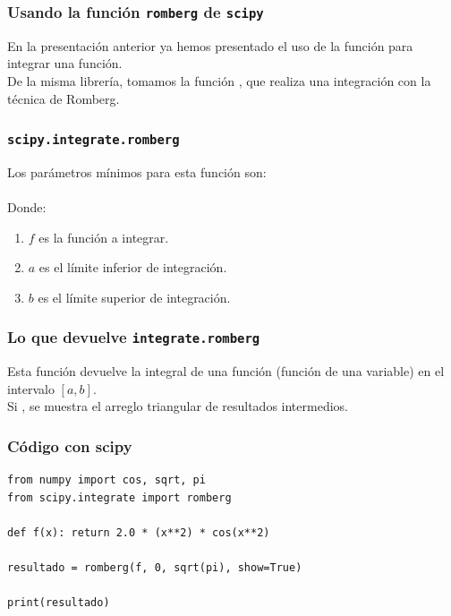 \documentclass[12pt]{beamer}
\begin{document}
\begin{frame}
\frametitle{Usando la función \texttt{romberg} de \texttt{scipy}}
En la presentación anterior ya hemos presentado el uso de la función  para integrar una función.
\\
\medskip
\pause
De la misma librería, tomamos la función , que realiza una integración con la técnica de Romberg.
\end{frame}
\begin{frame}[fragile]
\frametitle{\texttt{scipy.integrate.romberg}}
Los parámetros mínimos para esta función son:
\\
\bigskip
\pause
{}
\\
\bigskip
\pause
Donde:
\begin{enumerate}[<+->]
\item $f$ es la función a integrar.
\item $a$ es el límite inferior de integración.
\item $b$ es el límite superior de integración.
\end{enumerate}
\end{frame}
\begin{frame}[fragile]
\frametitle{Lo que devuelve \texttt{integrate.romberg}}
Esta función devuelve la integral de una función (función de una variable) en el intervalo $[a, b]$.
\\
\medskip
\pause
Si , se muestra el arreglo triangular de resultados intermedios.
\end{frame}
\begin{frame}[fragile]
\frametitle{Código con scipy}
\begin{lstlisting}[caption=Integración de Romberg con scipy]
from numpy import cos, sqrt, pi
from scipy.integrate import romberg

def f(x): return 2.0 * (x**2) * cos(x**2)

resultado = romberg(f, 0, sqrt(pi), show=True)

print(resultado)
\end{lstlisting}
\end{frame}
\end{document}
